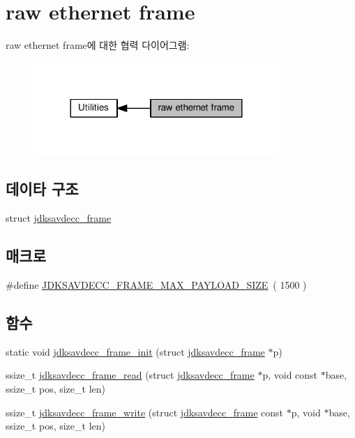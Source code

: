 \hypertarget{group__frame}{}\section{raw ethernet frame}
\label{group__frame}
raw ethernet frame에 대한 협력 다이어그램\+:
\nopagebreak
\begin{figure}[H]
\begin{center}
\leavevmode
\includegraphics[width=264pt]{group__frame}
\end{center}
\end{figure}
\subsection*{데이타 구조}
\begin{DoxyCompactItemize}
\item 
struct \hyperlink{structjdksavdecc__frame}{jdksavdecc\+\_\+frame}
\end{DoxyCompactItemize}
\subsection*{매크로}
\begin{DoxyCompactItemize}
\item 
\#define \hyperlink{group__frame_ga93cd53c237fa828f2d5045299571e4fe}{J\+D\+K\+S\+A\+V\+D\+E\+C\+C\+\_\+\+F\+R\+A\+M\+E\+\_\+\+M\+A\+X\+\_\+\+P\+A\+Y\+L\+O\+A\+D\+\_\+\+S\+I\+ZE}~( 1500 )
\end{DoxyCompactItemize}
\subsection*{함수}
\begin{DoxyCompactItemize}
\item 
static void \hyperlink{group__frame_ga14d8effbd6816c69743c5be3e98fea27}{jdksavdecc\+\_\+frame\+\_\+init} (struct \hyperlink{structjdksavdecc__frame}{jdksavdecc\+\_\+frame} $\ast$p)
\item 
ssize\+\_\+t \hyperlink{group__frame_gab6f5d97a229e032dbdd3a3cb18cfffb4}{jdksavdecc\+\_\+frame\+\_\+read} (struct \hyperlink{structjdksavdecc__frame}{jdksavdecc\+\_\+frame} $\ast$p, void const $\ast$base, ssize\+\_\+t pos, size\+\_\+t len)
\item 
ssize\+\_\+t \hyperlink{group__frame_gaba1e860c060886e82198907b17214aee}{jdksavdecc\+\_\+frame\+\_\+write} (struct \hyperlink{structjdksavdecc__frame}{jdksavdecc\+\_\+frame} const $\ast$p, void $\ast$base, ssize\+\_\+t pos, size\+\_\+t len)
\end{DoxyCompactItemize}


